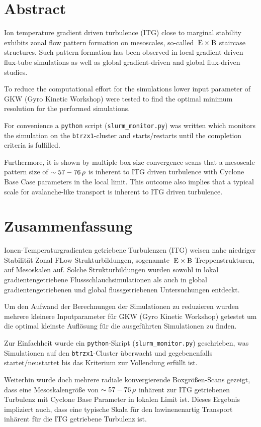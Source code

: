 \chapter*{Abstract}
\label{chap:abstractENG}

Ion temperature gradient driven turbulence (ITG) close to marginal stability exhibits zonal flow pattern formation on mesoscales, so-called $\mathrm{\:E}\times\mathrm{B}$ staircase structures. Such pattern formation has been observed in local gradient-driven flux-tube simulations as well as global gradient-driven and global flux-driven studies. \bigskip

To reduce the computational effort for the simulations lower input parameter of GKW (Gyro Kinetic Workshop) were tested to find the optimal minimum resolution for the performed simulations. \bigskip

For convenience a \texttt{python} script (\texttt{slurm\_monitor.py}) was written which monitors the simulation on the \texttt{btrzx1}-cluster and starts/restarts until the completion criteria is fulfilled. \bigskip

Furthermore, it is shown by multiple box size convergence scans that a mesoscale pattern  size of $\sim 57-76\,\rho$ is inherent to ITG driven turbulence with Cyclone Base Case parameters in the local limit. This outcome also implies that a typical scale for avalanche-like transport is inherent to ITG driven turbulence.

\chapter*{Zusammenfassung}
\label{chap:abstractDE}

Ionen-Temperaturgradienten getriebene Turbulenzen (ITG) weisen nahe niedriger Stabilität Zonal FLow Strukturbildungen, sogenannte $\mathrm{\:E}\times\mathrm{B}$ Treppenstrukturen, auf Mesoskalen auf. Solche Strukturbildungen wurden sowohl in lokal gradientengetriebene Flussschlauchsimulationen als auch in global gradientengetriebenen und global flussgetriebenen Untersuchungen entdeckt. \bigskip

Um den Aufwand der Berechnungen der Simulationen zu reduzieren wurden mehrere kleinere Inputparameter für GKW (Gyro Kinetic Workshop) getestet um die optimal kleinste Auflösung für die ausgeführten Simulationen zu finden. \bigskip

Zur Einfachheit wurde ein \texttt{python}-Skript (\texttt{slurm\_monitor.py}) geschrieben, was Simulationen auf den \texttt{btrzx1}-Cluster überwacht und gegebenenfalls startet/neustartet bis das Kriterium zur Vollendung erfüllt ist. \bigskip

Weiterhin wurde doch mehrere radiale konvergierende Boxgrößen-Scans gezeigt, dass eine Mesoskalengröße von $\sim 57-76\,\rho$ inhärent zur ITG getriebenen Turbulenz mit Cyclone Base Parameter in lokalen Limit ist. Dieses Ergebnis impliziert auch, dass eine typische Skala für den lawinenenartig Transport inhärent für die ITG getriebene Turbulenz ist.